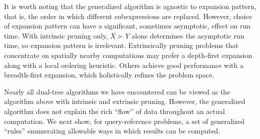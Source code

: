\documentclass[twoside,leqno,twocolumn]{article}
\newcommand{\prefsplit}[2]{#1 \succ #2}
\newcommand{\summary}{\delta}
\newcommand{\gnp}{\psi}
\newcommand{\kdroot}[1]{#1^{\text{root}}}
\newcommand{\outstat}{\sigma}
\begin{document}


It is worth noting that the generalized algorithm is agnostic to expansion pattern, that is, the order in which different subexpressions are replaced.
However, choice of expansion pattern can have a significant, sometimes asymptotic, effect on run time.
With intrinsic pruning only, $\prefsplit{X}{Y}$ alone determines the asymptotic run time, so expansion pattern is irrelevant.
Extrinsically pruning problems that concentrate on spatially nearby computations may prefer a depth-first expansion along with a local ordering heuristic.
Others achieve good performance with a breadth-first expansion, which holistically refines the problem space.

Nearly all dual-tree algorithms we have encountered can be viewed as the algorithm above with intrinsic and extrinsic pruning.
However, the generalized algorithm does not explain the rich ``flow'' of data throughout an actual computation.
We next show, for query-reference problems, a set of generalized ``rules'' enumerating allowable ways in which results can be computed.
\end{document}
